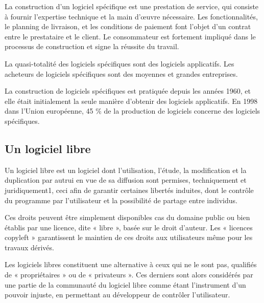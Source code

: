 La construction d'un logiciel spécifique est une prestation de service, qui consiste à fournir
l'expertise technique et la main d'œuvre nécessaire. Les fonctionnalités, le planning de livraison,
et les conditions de paiement font l'objet d'un contrat entre le prestataire et le client.
Le consommateur est fortement impliqué dans le processus de construction et signe la réussite du travail.

La quasi-totalité des logiciels spécifiques sont des logiciels applicatifs. Les acheteurs de
logiciels spécifiques sont des moyennes et grandes entreprises.

La construction de logiciels spécifiques est pratiquée depuis les années 1960, et elle
était initialement la seule manière d'obtenir des logiciels applicatifs. En 1998 dans
l'Union européenne, 45 \% de la production de logiciels concerne des logiciels spécifiques.

\subsection{Un logiciel libre}\label{subsec:logiciel-libre}
Un logiciel libre est un logiciel dont l'utilisation, l'étude, la modification et la duplication par
autrui en vue de sa diffusion sont permises, techniquement et juridiquement1, ceci afin de
garantir certaines libertés induites, dont le contrôle du programme par l'utilisateur et la
possibilité de partage entre individus.

Ces droits peuvent être simplement disponibles cas du domaine public ou bien établis par une licence,
dite « libre », basée sur le droit d'auteur. Les « licences copyleft » garantissent le maintien de ces
droits aux utilisateurs même pour les travaux dérivés.

Les logiciels libres constituent une alternative à ceux qui ne le sont pas, qualifiés de
« propriétaires » ou de « privateurs ». Ces derniers sont alors considérés par une partie de
la communauté du logiciel libre comme étant l'instrument d'un pouvoir injuste, en permettant au
développeur de contrôler l'utilisateur.

